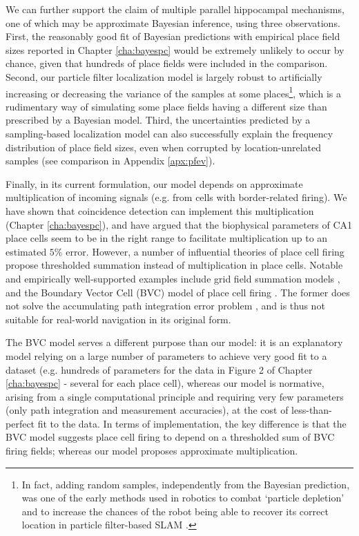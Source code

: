We can further support the claim of multiple parallel hippocampal mechanisms, one of which may be approximate Bayesian inference, using three observations. First, the reasonably good fit of Bayesian predictions with empirical place field sizes reported in Chapter \ref{cha:bayespc} would be extremely unlikely to occur by chance, given that hundreds of place fields were included in the comparison. Second, our particle filter localization model is largely robust to artificially increasing or decreasing the variance of the samples at some places\footnote{In fact, adding random samples, independently from the Bayesian prediction, was one of the early methods used in robotics to combat `particle depletion' and to increase the chances of the robot being able to recover its correct location in particle filter-based SLAM \citep{thrun2005probabilistic}.}, which is a rudimentary way of simulating some place fields having a different size than prescribed by a Bayesian model. Third, the uncertainties predicted by a sampling-based localization model can also successfully explain the frequency distribution of place field sizes, even when corrupted by location-unrelated samples (see comparison in Appendix \ref{apx:pfev}).

Finally, in its current formulation, our model depends on approximate multiplication of incoming signals (e.g. from cells with border-related firing). We have shown that coincidence detection can implement this multiplication (Chapter \ref{cha:bayespc}), and have argued that the biophysical parameters of CA1 place cells seem to be in the right range to facilitate multiplication up to an estimated $5\%$ error. However, a number of influential theories of place cell firing propose thresholded summation instead of multiplication in place cells. Notable and empirically well-supported examples include grid field summation models \citep{solstad2006grid}, and the Boundary Vector Cell (BVC) model of place cell firing \citep{hartley2000modeling, barry2006boundary}. The former does not solve the accumulating path integration error problem \citep{etienne1996path}, and is thus not suitable for real-world navigation in its original form. 

The BVC model serves a different purpose than our model: it is an explanatory model relying on a large number of parameters to achieve very good fit to a dataset (e.g. hundreds of parameters for the data in Figure 2 of Chapter \ref{cha:bayespc} - several for each place cell), whereas our model is normative, arising from a single computational principle and requiring very few parameters (only path integration and measurement accuracies), at the cost of less-than-perfect fit to the data. In terms of implementation, the key difference is that the BVC model suggests place cell firing to depend on a thresholded sum of BVC firing fields; whereas our model proposes approximate multiplication. 

